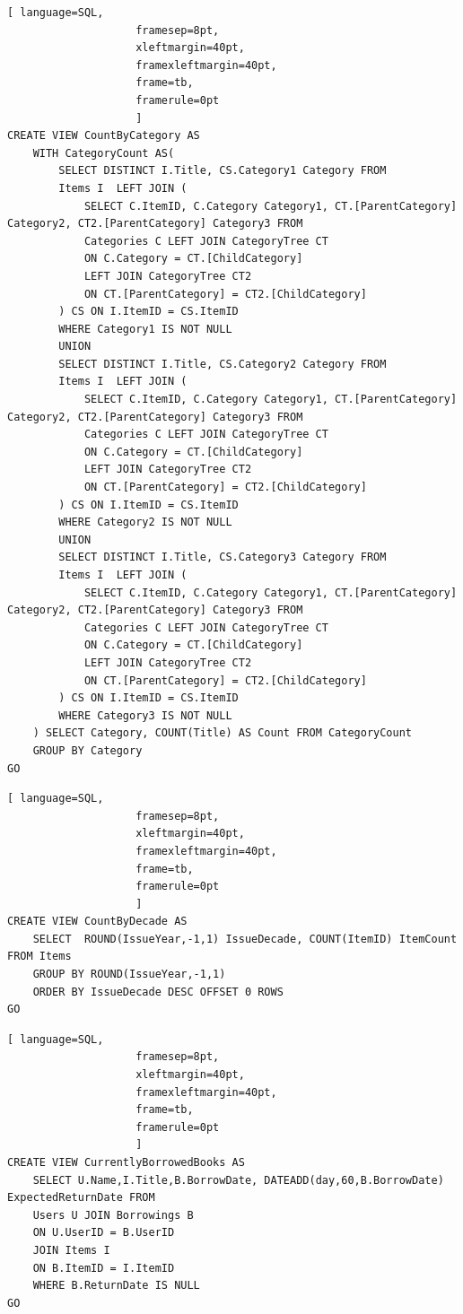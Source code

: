 \documentclass{article}
\begin{document}
\begin{lstlisting}[ language=SQL,
                    framesep=8pt,
                    xleftmargin=40pt,
                    framexleftmargin=40pt,
                    frame=tb,
                    framerule=0pt
                    ]
CREATE VIEW CountByCategory AS
	WITH CategoryCount AS(
		SELECT DISTINCT I.Title, CS.Category1 Category FROM
		Items I  LEFT JOIN (
			SELECT C.ItemID, C.Category Category1, CT.[ParentCategory] Category2, CT2.[ParentCategory] Category3 FROM
			Categories C LEFT JOIN CategoryTree CT
			ON C.Category = CT.[ChildCategory]
			LEFT JOIN CategoryTree CT2
			ON CT.[ParentCategory] = CT2.[ChildCategory]
		) CS ON I.ItemID = CS.ItemID
		WHERE Category1 IS NOT NULL
		UNION
		SELECT DISTINCT I.Title, CS.Category2 Category FROM
		Items I  LEFT JOIN (
			SELECT C.ItemID, C.Category Category1, CT.[ParentCategory] Category2, CT2.[ParentCategory] Category3 FROM
			Categories C LEFT JOIN CategoryTree CT
			ON C.Category = CT.[ChildCategory]
			LEFT JOIN CategoryTree CT2
			ON CT.[ParentCategory] = CT2.[ChildCategory]
		) CS ON I.ItemID = CS.ItemID
		WHERE Category2 IS NOT NULL
		UNION
		SELECT DISTINCT I.Title, CS.Category3 Category FROM
		Items I  LEFT JOIN (
			SELECT C.ItemID, C.Category Category1, CT.[ParentCategory] Category2, CT2.[ParentCategory] Category3 FROM
			Categories C LEFT JOIN CategoryTree CT
			ON C.Category = CT.[ChildCategory]
			LEFT JOIN CategoryTree CT2
			ON CT.[ParentCategory] = CT2.[ChildCategory]
		) CS ON I.ItemID = CS.ItemID
		WHERE Category3 IS NOT NULL
	) SELECT Category, COUNT(Title) AS Count FROM CategoryCount
	GROUP BY Category
GO
\end{lstlisting}

\begin{lstlisting}[ language=SQL,
                    framesep=8pt,
                    xleftmargin=40pt,
                    framexleftmargin=40pt,
                    frame=tb,
                    framerule=0pt
                    ]
CREATE VIEW CountByDecade AS
	SELECT  ROUND(IssueYear,-1,1) IssueDecade, COUNT(ItemID) ItemCount FROM Items
	GROUP BY ROUND(IssueYear,-1,1)
	ORDER BY IssueDecade DESC OFFSET 0 ROWS 
GO
\end{lstlisting}

\begin{lstlisting}[ language=SQL,
                    framesep=8pt,
                    xleftmargin=40pt,
                    framexleftmargin=40pt,
                    frame=tb,
                    framerule=0pt
                    ]
CREATE VIEW CurrentlyBorrowedBooks AS
    SELECT U.Name,I.Title,B.BorrowDate, DATEADD(day,60,B.BorrowDate) ExpectedReturnDate FROM
    Users U JOIN Borrowings B
    ON U.UserID = B.UserID
    JOIN Items I
    ON B.ItemID = I.ItemID
    WHERE B.ReturnDate IS NULL
GO
\end{lstlisting}
\end{document}
